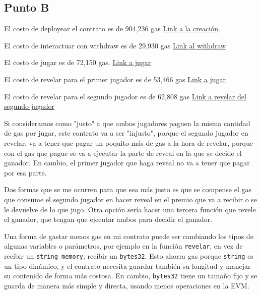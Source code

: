 \documentclass[12pt]{article}
\begin{document}
\subsection*{Punto B}
El costo de deployear el contrato es de 904,236 gas \href{https://sepolia.etherscan.io/tx/0xada5c14a0889e3d5cbb4d5b3b86e3e98e126095b995e538e33109778e51f670c}{Link a la creación}.

El costo de interactuar con withdraw es de 29,930 gas \href{https://sepolia.etherscan.io/tx/0xd9e2097eb704afd6eafb454ca006b86f11eb5ff2cea64eacea869429b6ff8223}{Link al withdraw}

El costo de jugar es de 72,150 gas. 
\href{https://sepolia.etherscan.io/tx/0xb953eca99800ea9558a27d120fd7a1755cec04efb99100e38da9d5e659dc571c}{Link a jugar}

El costo de revelar para el primer jugador es de 53,466 gas \href{https://sepolia.etherscan.io/tx/0x07437d0462c71bd80d5774399a499576efcee9750f058ca6dd6e55115b84d9eb}{Link a jugar}

El costo de revelar para el segundo jugador es de 62,808 gas \href{https://sepolia.etherscan.io/tx/0xb953eca99800ea9558a27d120fd7a1755cec04efb99100e38da9d5e659dc571c}{Link a revelar del segundo jugador}


Si consideramos como "justo" a que ambos jugadores paguen la misma cantidad de gas por jugar, este contrato va a ser "injusto", porque el segundo jugador en revelar, va a tener que pagar un poquito más de gas a la hora de revelar, porque con el gas que pague se va a ejecutar la parte de reveal en la que se decide el ganador. En cambio, el primer jugador que haga reveal no va a tener que pagar por esa parte. 

Dos formas que se me ocurren para que sea más justo es que se compense el gas que consume el segundo jugador en hacer reveal en el premio que va a recibir o se le devuelve de lo que jugo. Otra opción sería hacer una tercera función que revele el ganador, que tengan que ejecutar ambos para decidir el ganador. 

Una forma de gastar menos gas en mi contrato puede ser cambiando los tipos de algunas variables o parámetros, por ejemplo en la función \texttt{revelar}, 
en vez de recibir un \texttt{string memory}, recibir un \texttt{bytes32}. 
Esto ahorra gas porque \texttt{string} es un tipo dinámico, y el contrato necesita guardar también su longitud y manejar su contenido de forma más costosa. 
En cambio, \texttt{bytes32} tiene un tamaño fijo y se guarda de manera más simple y directa, usando menos operaciones en la EVM.
\end{document}
